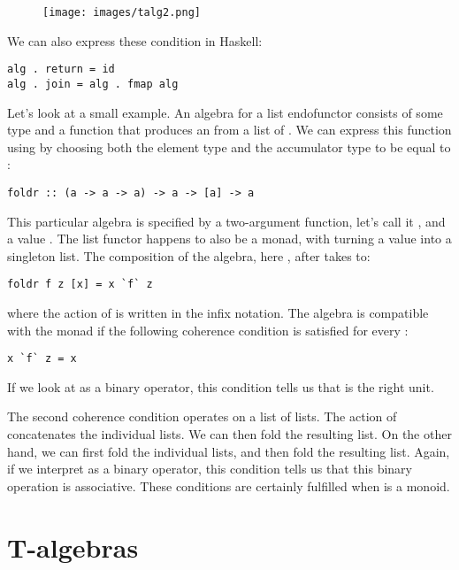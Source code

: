 \begin{figure}[H]
\centering
\texttt{[image: images/talg2.png]}
\end{figure}

\noindent
We can also express these condition in Haskell:

\begin{Verbatim}
alg . return = id
alg . join = alg . fmap alg
\end{Verbatim}
Let's look at a small example. An algebra for a list endofunctor
consists of some type  and a function that produces an
 from a list of . We can express this function using
 by choosing both the element type and the accumulator
type to be equal to :

\begin{Verbatim}
foldr :: (a -> a -> a) -> a -> [a] -> a
\end{Verbatim}
This particular algebra is specified by a two-argument function, let's
call it , and a value . The list functor happens to
also be a monad, with  turning a value into a singleton
list. The composition of the algebra, here , after
 takes  to:

\begin{Verbatim}
foldr f z [x] = x `f` z
\end{Verbatim}
where the action of  is written in the infix notation. The
algebra is compatible with the monad if the following coherence
condition is satisfied for every :

\begin{Verbatim}
x `f` z = x
\end{Verbatim}
If we look at  as a binary operator, this condition tells us
that  is the right unit.

The second coherence condition operates on a list of lists. The action
of  concatenates the individual lists. We can then fold the
resulting list. On the other hand, we can first fold the individual
lists, and then fold the resulting list. Again, if we interpret
 as a binary operator, this condition tells us that this
binary operation is associative. These conditions are certainly
fulfilled when  is a monoid.

\section{T-algebras}

